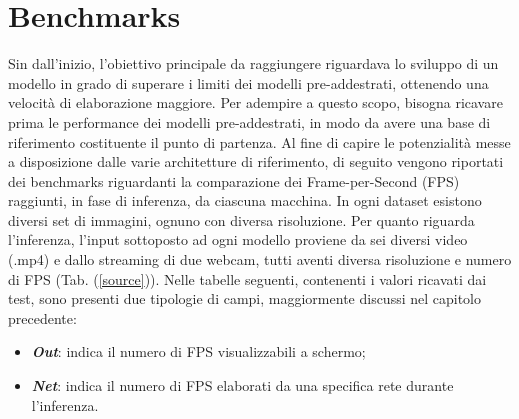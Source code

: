 \section{Benchmarks}
Sin dall'inizio, l'obiettivo principale da raggiungere riguardava lo sviluppo di 
un modello in grado di superare i limiti dei modelli pre-addestrati, ottenendo 
una velocità di elaborazione maggiore. Per adempire a questo scopo, bisogna 
ricavare prima le performance dei modelli pre-addestrati, in modo da avere 
una base di riferimento costituente il punto di partenza. Al fine di capire 
le potenzialità messe a disposizione dalle varie architetture di riferimento, 
di seguito vengono riportati dei benchmarks riguardanti la comparazione 
dei Frame-per-Second (FPS) raggiunti, in fase di inferenza, da ciascuna 
macchina. In ogni dataset esistono diversi set di immagini, ognuno con 
diversa risoluzione. Per quanto riguarda l'inferenza, l'input sottoposto ad 
ogni modello proviene da sei diversi video (.mp4) e dallo streaming di due 
webcam, tutti aventi diversa risoluzione e numero di FPS (Tab. (\ref{source})). 
Nelle tabelle seguenti, contenenti i valori ricavati dai test, sono presenti due 
tipologie di campi, maggiormente discussi nel capitolo precedente:
\begin{itemize}
    \item {\bfseries{\emph{Out}}}: indica il numero di FPS visualizzabili a schermo;
    \item {\bfseries{\emph{Net}}}: indica il numero di FPS elaborati da una specifica rete durante 
    l'inferenza.
\end{itemize}

